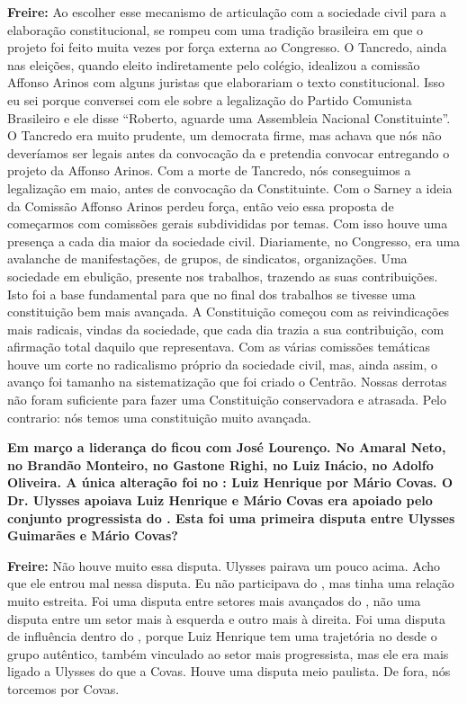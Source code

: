 \textbf{Freire:} Ao escolher esse mecanismo de articulação com a
sociedade civil para a elaboração constitucional, se rompeu com uma
tradição brasileira em que o projeto foi feito muita vezes por força
externa ao Congresso. O Tancredo, ainda nas eleições, quando eleito
indiretamente pelo colégio, idealizou a comissão Affonso Arinos com
alguns juristas que elaborariam o texto constitucional. Isso eu sei
porque conversei com ele sobre a legalização do Partido Comunista
Brasileiro e ele disse ``Roberto, aguarde uma Assembleia Nacional
Constituinte''. O Tancredo era muito prudente, um democrata firme, mas
achava que nós não deveríamos ser legais antes da convocação da  e
pretendia convocar entregando o projeto da Affonso Arinos. Com a morte
de Tancredo, nós conseguimos a legalização em maio, antes de convocação
da Constituinte. Com o Sarney a ideia da Comissão Affonso Arinos perdeu
força, então veio essa proposta de começarmos com comissões gerais
subdivididas por temas. Com isso houve uma presença a cada dia maior da
sociedade civil. Diariamente, no Congresso, era uma avalanche de
manifestações, de grupos, de sindicatos, organizações. Uma sociedade em
ebulição, presente nos trabalhos, trazendo as suas contribuições. Isto
foi a base fundamental para que no final dos trabalhos se tivesse uma
constituição bem mais avançada. A Constituição começou com as
reivindicações mais radicais, vindas da sociedade, que cada dia trazia a
sua contribuição, com afirmação total daquilo que representava. Com as
várias comissões temáticas houve um corte no radicalismo próprio da
sociedade civil, mas, ainda assim, o avanço foi tamanho na
sistematização que foi criado o Centrão. Nossas derrotas não foram
suficiente para fazer uma Constituição conservadora e atrasada. Pelo
contrario: nós temos uma constituição muito avançada.

\textbf{Em março a liderança do  ficou com José Lourenço. No 
Amaral Neto, no  Brandão Monteiro, no  Gastone Righi, no  Luiz
Inácio, no  Adolfo Oliveira. A única alteração foi no : Luiz
Henrique por Mário Covas. O Dr. Ulysses apoiava Luiz Henrique e Mário
Covas era apoiado pelo conjunto progressista do . Esta foi uma
primeira disputa entre Ulysses Guimarães e Mário Covas?}

\textbf{Freire:} Não houve muito essa disputa. Ulysses pairava um pouco
acima. Acho que ele entrou mal nessa disputa. Eu não participava do
, mas tinha uma relação muito estreita. Foi uma disputa entre
setores mais avançados do , não uma disputa entre um setor mais à
esquerda e outro mais à direita. Foi uma disputa de influência dentro do
, porque Luiz Henrique tem uma trajetória no  desde o grupo
autêntico, também vinculado ao setor mais progressista, mas ele era mais
ligado a Ulysses do que a Covas. Houve uma disputa meio paulista. De
fora, nós torcemos por Covas.

